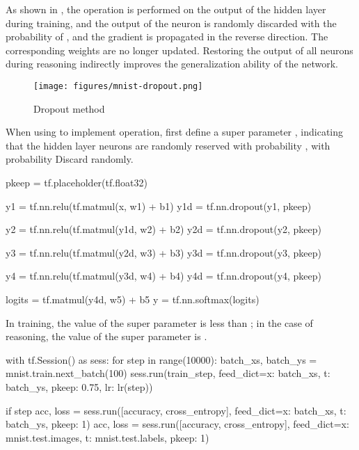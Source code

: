 \begin{content}
\begin{content}
As shown in , the  operation is performed on the output of the hidden layer during training, and the output of the neuron is randomly discarded with the probability of , and the gradient is propagated in the reverse direction. The corresponding weights are no longer updated. Restoring the output of all neurons during reasoning indirectly improves the generalization ability of the network.

\begin{figure}[H]
  \centering
  \texttt{[image: figures/mnist-dropout.png]}
  \caption{Dropout method}
  \label{fig:mnist-dropout}
\end{figure}

When using \tf{} to implement  operation, first define a super parameter , indicating that the hidden layer neurons are randomly reserved with probability , with probability  Discard randomly.

\begin{leftbar}
\begin{python}
pkeep = tf.placeholder(tf.float32)

y1 = tf.nn.relu(tf.matmul(x,  w1) + b1)
y1d = tf.nn.dropout(y1, pkeep)

y2 = tf.nn.relu(tf.matmul(y1d, w2) + b2)
y2d = tf.nn.dropout(y2, pkeep)

y3 = tf.nn.relu(tf.matmul(y2d, w3) + b3)
y3d = tf.nn.dropout(y3, pkeep)

y4 = tf.nn.relu(tf.matmul(y3d, w4) + b4)
y4d = tf.nn.dropout(y4, pkeep)

logits = tf.matmul(y4d, w5) + b5
y = tf.nn.softmax(logits)
\end{python}
\end{leftbar}

In training, the value of the super parameter  is less than ; in the case of reasoning, the value of the super parameter  is .

\begin{leftbar}
\begin{python}
with tf.Session() as sess:
  for step in range(10000):
    batch_xs, batch_ys = mnist.train.next_batch(100)
    sess.run(train_step, 
      feed_dict={x: batch_xs, t: batch_ys, pkeep: 0.75, lr: lr(step)})

    if step %
      acc, loss = sess.run([accuracy, cross_entropy], 
        feed_dict={x: batch_xs, t: batch_ys, pkeep: 1})
      acc, loss = sess.run([accuracy, cross_entropy], 
        feed_dict={x: mnist.test.images, t: mnist.test.labels, pkeep: 1})
\end{python}
\end{leftbar}


\end{content}
\end{content}
